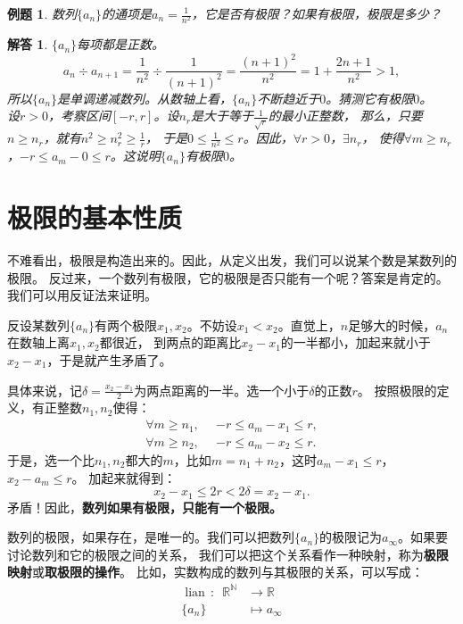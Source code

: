 \documentclass[12pt,UTF8]{ctexbook}
\newcommand\lian[1]{
    \underset{#1}{\operatorname{lian}\,}
}
\newtheorem{et}{例题}[section]
\newtheorem*{so}{解答}
\begin{document}
\begin{et}
数列$\{a_n\}$的通项是$a_n = \frac{1}{n^2}$，它是否有极限？如果有极限，极限是多少？    
\end{et}
\begin{so}
    $\{a_n\}$每项都是正数。
    $$a_{n} \div a_{n+1} = \frac{1}{n^2} \div \frac{1}{(n+1)^2} = \frac{(n+1)^2}{n^2} = 1 + \frac{2n+1}{n^2} > 1,$$
    所以$\{a_n\}$是单调递减数列。从数轴上看，$\{a_n\}$不断趋近于$0$。猜测它有极限$0$。\\
    设$r>0$，考察区间$[-r,r]$。设$n_r$是大于等于$\frac{1}{\sqrt{r}}$的最小正整数，
    那么，只要$n \geqslant n_r$，就有$n^2 \geqslant n_r^2 \geqslant \frac{1}{r}$，
    于是$0 \leqslant \frac{1}{n^2} \leqslant r$。因此，$\forall r > 0$，$\exists n_r$，
    使得$\forall m \geqslant n_r$，$ -r  \leqslant a_m - 0 \leqslant r$。这说明$\{a_n\}$有极限$0$。    
\end{so}

\section{极限的基本性质}
不难看出，极限是构造出来的。因此，从定义出发，我们可以说某个数是某数列的极限。
反过来，一个数列有极限，它的极限是否只能有一个呢？答案是肯定的。我们可以用反证法来证明。

反设某数列$\{a_n\}$有两个极限$x_1, x_2$。不妨设$x_1 < x_2$。直觉上，$n$足够大的时候，$a_n$在数轴上离$x_1, x_2$都很近，
到两点的距离比$x_2 - x_1$的一半都小，加起来就小于$x_2 - x_1$，于是就产生矛盾了。

具体来说，记$\delta = \frac{x_2 - x_1}{2}$为两点距离的一半。选一个小于$\delta$的正数$r$。
按照极限的定义，有正整数$n_1, n_2$使得：
\begin{align*}
    \forall m \geqslant n_1 , \,\,\,& -r \leqslant a_m - x_1 \leqslant r ,  \\
    \forall m \geqslant n_2 , \,\,\,& -r \leqslant a_m - x_2 \leqslant r .  
\end{align*}
于是，选一个比$n_1,n_2$都大的$m$，比如$m=n_1+n_2$，这时$a_m - x_1 \leqslant r$，$x_2 - a_m \leqslant r$。
加起来就得到：
$$x_2 - x_1 \leqslant 2r < 2\delta = x_2 - x_1.$$
矛盾！因此，\textbf{数列如果有极限，只能有一个极限。}

数列的极限，如果存在，是唯一的。我们可以把数列$\{a_n\}$的极限记为$a_\infty$。如果要讨论数列和它的极限之间的关系，
我们可以把这个关系看作一种映射，称为\textbf{极限映射}或\textbf{取极限的操作}。
比如，实数构成的数列与其极限的关系，可以写成：
\begin{align*}
    \lian{} : \,\,\, \mathbb{R}^\mathbb{N} &\longrightarrow \mathbb{R}  \\
    \{a_n\} &\longmapsto a_\infty 
\end{align*}
\end{document}
